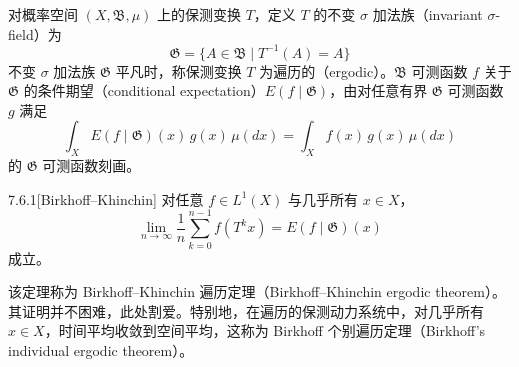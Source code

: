 对概率空间 $(X,\mathfrak{B},\mu)$ 上的保测变换 $T$，定义 $T$ 的不变 $\sigma$ 加法族（invariant $\sigma$-field）为
\begin{equation}
  \mathfrak{G}=\{A\in\mathfrak{B}\mid T^{-1}(A)=A\}
  \tag{7.6.1}
\end{equation}
不变 $\sigma$ 加法族 $\mathfrak{G}$ 平凡时，称保测变换 $T$ 为遍历的（ergodic）。$\mathfrak{B}$ 可测函数 $f$ 关于 $\mathfrak{G}$ 的条件期望（conditional expectation）$E(f\mid\mathfrak{G})$，由对任意有界 $\mathfrak{G}$ 可测函数 $g$ 满足
\begin{equation}
  \int_X E(f\mid\mathfrak{G})(x)\,g(x)\,\mu(dx)
  =\int_X f(x)\,g(x)\,\mu(dx)
  \tag{7.6.2}
\end{equation}
的 $\mathfrak{G}$ 可测函数刻画。

\begin{theorem}{7.6.1}[Birkhoff--Khinchin]
对任意 $f\in L^1(X)$ 与几乎所有 $x\in X$，
\begin{equation}
  \lim_{n\to\infty}\frac1n\sum_{k=0}^{n-1}f(T^kx)=E(f\mid\mathfrak{G})(x)
  \tag{7.6.3}
\end{equation}
成立。
\end{theorem}

该定理称为 Birkhoff--Khinchin 遍历定理（Birkhoff--Khinchin ergodic theorem）。其证明并不困难，此处割爱。特别地，在遍历的保测动力系统中，对几乎所有 $x\in X$，时间平均收敛到空间平均，这称为 Birkhoff 个别遍历定理（Birkhoff's individual ergodic theorem）。



